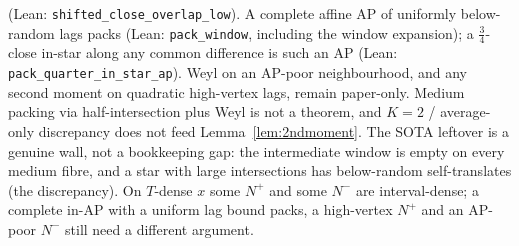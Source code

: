\documentclass[11pt]{article}
\theoremstyle{definition}
\begin{document}
(Lean: \texttt{shifted\_close\_overlap\_low}).
A complete affine AP of uniformly below-random lags packs
(Lean: \texttt{pack\_window}, including the window expansion);
a $\tfrac34$-close in-star along any common difference is such an AP
(Lean: \texttt{pack\_quarter\_in\_star\_ap}).
Weyl on an AP-poor neighbourhood, and any second moment on
quadratic high-vertex lags, remain paper-only.
Medium packing via half-intersection plus Weyl is not a theorem,
and $K=2$ / average-only discrepancy does not feed
Lemma~\ref{lem:2ndmoment}.
The SOTA leftover is a genuine wall, not a bookkeeping gap:
the intermediate window is empty on every medium fibre, and a star with
large intersections has below-random self-translates (the discrepancy).
On $T$-dense $x$ some $N^+$ and some $N^-$ are interval-dense; a
complete in-AP with a uniform lag bound packs, a high-vertex $N^+$
and an AP-poor $N^-$ still need a different argument.
\end{document}
